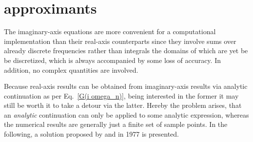\section{ approximants}
\label{Pade approximants}

The imaginary-axis  equations are more convenient for a
computational implementation than their real-axis counterparts since they
involve sums over already discrete  frequencies rather than
integrals the domains of which are yet be be discretized, which is always
accompanied by some loss of accuracy. In addition, no complex quantities are
involved.

Because real-axis results can be obtained from imaginary-axis results via
analytic continuation as per Eq.~\ref{G(i omega_n)}, being interested in the
former it may still be worth it to take a detour via the latter. Hereby the
problem arises, that an \emph{analytic} continuation can only be applied to some
analytic expression, whereas the numerical results are generally just a finite
set of sample points. In the following, a solution proposed by 
and  in 1977 \cite{VidbergSerene77} is presented.

